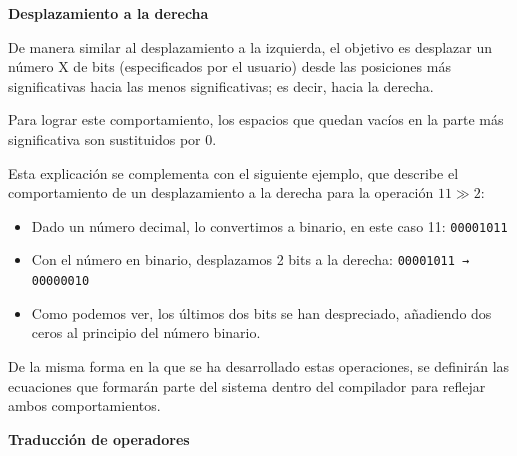 \documentclass[a4paper,12pt]{report}
\begin{document}
	
	\vspace{0.2cm}
	\noindent \textbf{Desplazamiento a la derecha}
	\vspace{0.2cm}
	
	\noindent De manera similar al desplazamiento a la izquierda, el objetivo es desplazar un número X de bits (especificados por el usuario) desde las posiciones más significativas hacia las menos significativas; es decir, hacia la derecha.
	
	\vspace{0.2cm}
	\noindent Para lograr este comportamiento, los espacios que quedan vacíos en la parte más significativa son sustituidos por 0.
	
	\vspace{0.2cm}
	\noindent Esta explicación se complementa con el siguiente ejemplo, que describe el comportamiento de un desplazamiento a la derecha para la operación $11 \gg 2$:
	
	\begin{itemize}
		\item Dado un número decimal, lo convertimos a binario, en este caso 11: \texttt{00001011}
		
		\item Con el número en binario, desplazamos 2 bits a la derecha: \texttt{00001011 → 00000010}
		
		\item Como podemos ver, los últimos dos bits se han despreciado, añadiendo dos ceros al principio del número binario.
	\end{itemize}
	
	
	\noindent De la misma forma en la que se ha desarrollado estas operaciones, se definirán las ecuaciones que formarán parte del sistema dentro del compilador para reflejar ambos comportamientos.
	
	\vspace{0.5cm}
	\noindent \textbf{Traducción de operadores}
	\vspace{0.2cm}
	
\end{document}
